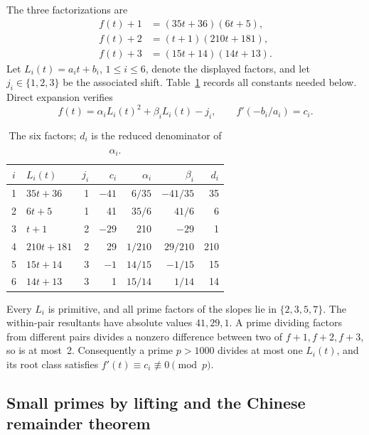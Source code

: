 \documentclass[11pt,a4paper]{article}
\newcommand{\1}{\mathbf 1}
\numberwithin{equation}{section}
\begin{document}
The three factorizations are
\begin{equation}\label{eq:factors}
\begin{aligned}
 f(t)+1&=(35t+36)(6t+5),\\
 f(t)+2&=(t+1)(210t+181),\\
 f(t)+3&=(15t+14)(14t+13).
\end{aligned}
\end{equation}
Let \(L_i(t)=a_it+b_i\), \(1\leq i\leq6\), denote the displayed factors,
and let \(j_i\in\{1,2,3\}\) be the associated shift. Table~\ref{tab:forms}
records all constants needed below. Direct expansion verifies
\begin{equation}\label{eq:coordinates}
 f(t)=\alpha_iL_i(t)^2+\beta_iL_i(t)-j_i,
 \qquad f'(-b_i/a_i)=c_i.
\end{equation}
\begin{table}[ht]
\centering
\caption{The six factors; \(d_i\) is the reduced denominator of \(\alpha_i\).}
\label{tab:forms}
\begin{tabular}{@{}clrrrrr@{}}
\toprule
\(i\)&\(L_i(t)\)&\(j_i\)&\(c_i\)&\(\alpha_i\)&\(\beta_i\)&\(d_i\)\\
\midrule
1&\(35t+36\)&1&\(-41\)&\(6/35\)&\(-41/35\)&35\\
2&\(6t+5\)&1&41&\(35/6\)&\(41/6\)&6\\
3&\(t+1\)&2&\(-29\)&210&\(-29\)&1\\
4&\(210t+181\)&2&29&\(1/210\)&\(29/210\)&210\\
5&\(15t+14\)&3&\(-1\)&\(14/15\)&\(-1/15\)&15\\
6&\(14t+13\)&3&1&\(15/14\)&\(1/14\)&14\\
\bottomrule
\end{tabular}
\end{table}

Every \(L_i\) is primitive, and all prime factors of the slopes lie in
\(\{2,3,5,7\}\). The within-pair resultants have absolute values
\(41,29,1\). A prime dividing factors from different pairs divides a
nonzero difference between two of \(f+1,f+2,f+3\), so is at most~2.
Consequently a prime \(p>1000\) divides at most one \(L_i(t)\), and its
root class satisfies \(f'(t)\equiv c_i\not\equiv0\pmod p\).

\subsection{Small primes by lifting and the Chinese remainder theorem}
\end{document}
